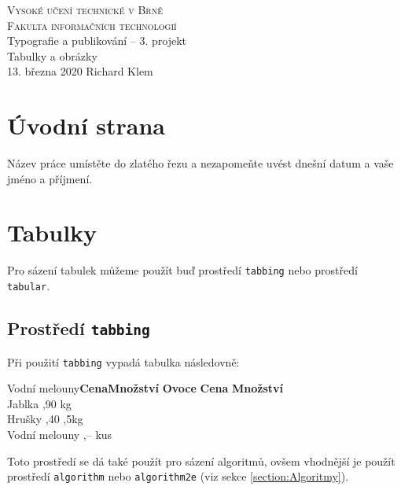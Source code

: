 \documentclass[a4paper, 11pt]{article}
\begin{document}
\begin{titlepage}
\begin{center}
\textsc{\Huge{Vysoké učení technické v Brně\\[0,3em]}
{\huge{Fakulta informačních technologií}}}\\
{\LARGE Typografie a publikování -- 3. projekt}\\[0,3em]
{\Huge{Tabulky a obrázky}}\\
{\Large 13. března 2020 \hfill Richard Klem}
\end{center}
\end{titlepage}
\section{Úvodní strana}
\noindent Název práce umístěte do zlatého řezu a nezapomeňte uvést dnešní datum a vaše jméno a příjmení.
\section{Tabulky}
Pro sázení tabulek můžeme použít buď prostředí \verb|tabbing| nebo prostředí \verb|tabular|.
\subsection{Prostředí \texttt{tabbing}}
Při použití \verb|tabbing| vypadá tabulka následovně:
\begin{tabbing}
Vodní melouny\quad \= \textbf{Cena}\quad \= \textbf{Množství}\kill
\textbf{Ovoce} \> \textbf{Cena} \> \textbf{Množství}\\
Jablka    ,90      kg\\
Hrušky    ,40     ,5kg\\
Vodní melouny    ,--      kus\\
\end{tabbing}

\noindent Toto prostředí se dá také použít pro sázení algoritmů, ovšem vhodnější je použít 
prostředí \verb|algorithm| nebo \verb|algorithm2e| (viz sekce \ref{section:Algoritmy}).
\end{document}
